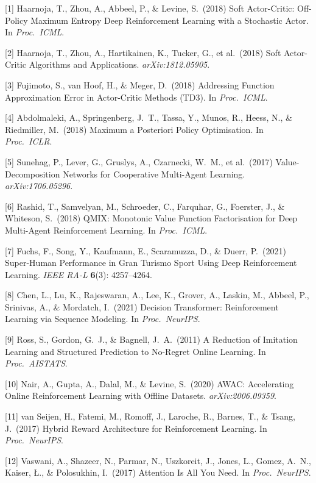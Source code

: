 \documentclass{article}
\begin{document}
[1] Haarnoja, T., Zhou, A., Abbeel, P., \& Levine, S.\ (2018) Soft
Actor-Critic: Off-Policy Maximum Entropy Deep Reinforcement Learning
with a Stochastic Actor. In \emph{Proc.\ ICML}.

[2] Haarnoja, T., Zhou, A., Hartikainen, K., Tucker, G., et al.\
(2018) Soft Actor-Critic Algorithms and Applications.
\emph{arXiv:1812.05905}.

[3] Fujimoto, S., van Hoof, H., \& Meger, D.\ (2018) Addressing
Function Approximation Error in Actor-Critic Methods (TD3). In
\emph{Proc.\ ICML}.

[4] Abdolmaleki, A., Springenberg, J.\ T., Tassa, Y., Munos, R.,
Heess, N., \& Riedmiller, M.\ (2018) Maximum a Posteriori Policy
Optimisation. In \emph{Proc.\ ICLR}.

[5] Sunehag, P., Lever, G., Gruslys, A., Czarnecki, W.\ M., et al.\
(2017) Value-Decomposition Networks for Cooperative Multi-Agent
Learning. \emph{arXiv:1706.05296}.

[6] Rashid, T., Samvelyan, M., Schroeder, C., Farquhar, G., Foerster,
J., \& Whiteson, S.\ (2018) QMIX: Monotonic Value Function
Factorisation for Deep Multi-Agent Reinforcement Learning. In
\emph{Proc.\ ICML}.

[7] Fuchs, F., Song, Y., Kaufmann, E., Scaramuzza, D., \& Duerr, P.\
(2021) Super-Human Performance in Gran Turismo Sport Using Deep
Reinforcement Learning. \emph{IEEE RA-L} \textbf{6}(3): 4257--4264.

[8] Chen, L., Lu, K., Rajeswaran, A., Lee, K., Grover, A., Laskin, M.,
Abbeel, P., Srinivas, A., \& Mordatch, I.\ (2021) Decision
Transformer: Reinforcement Learning via Sequence Modeling. In
\emph{Proc.\ NeurIPS}.

[9] Ross, S., Gordon, G.\ J., \& Bagnell, J.\ A.\ (2011) A Reduction
of Imitation Learning and Structured Prediction to No-Regret Online
Learning. In \emph{Proc.\ AISTATS}.

[10] Nair, A., Gupta, A., Dalal, M., \& Levine, S.\ (2020) AWAC:
Accelerating Online Reinforcement Learning with Offline Datasets.
\emph{arXiv:2006.09359}.

[11] van Seijen, H., Fatemi, M., Romoff, J., Laroche, R., Barnes, T.,
\& Tsang, J.\ (2017) Hybrid Reward Architecture for Reinforcement
Learning. In \emph{Proc.\ NeurIPS}.

[12] Vaswani, A., Shazeer, N., Parmar, N., Uszkoreit, J., Jones, L.,
Gomez, A.\ N., Kaiser, \L., \& Polosukhin, I.\ (2017) Attention Is
All You Need. In \emph{Proc.\ NeurIPS}.
\end{document}
